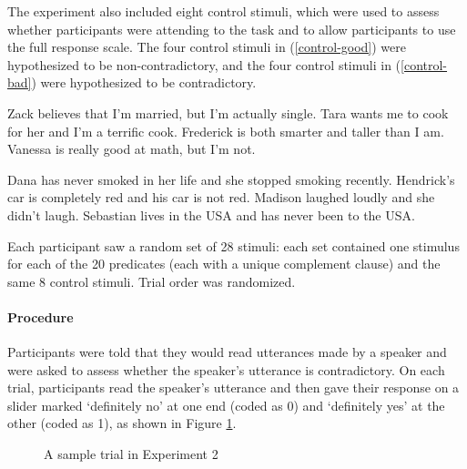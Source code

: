 \documentclass[11pt,fleqn]{article}
\newcommand{\6}{\mbox{$[\hspace*{-.6mm}[$}}
\newcommand{\9}{\mbox{$]\hspace*{-.6mm}]$}}
\begin{document}
The experiment also included eight control stimuli, which were used to assess whether participants were attending to the task and to allow participants to use the full response scale. The four control stimuli in (\ref{control-good}) were hypothesized to be non-contradictory, and the four control stimuli in (\ref{control-bad}) were hypothesized to be contradictory.

\begin{exe}
\ex\label{control-good2}
\begin{xlist}
\ex Zack believes that I'm married, but I'm actually single.
\ex Tara wants me to cook for her and I'm a terrific cook.
\ex Frederick is both smarter and taller than I am.
\ex Vanessa is really good at math, but I'm not.
\end{xlist}
\ex\label{control-bad2}
\begin{xlist}
\ex Dana has never smoked in her life and she stopped smoking recently.
\ex Hendrick's car is completely red and his car is not red.
\ex Madison laughed loudly and she didn't laugh.
\ex Sebastian lives in the USA and has never been to the USA.
\end{xlist}
\end{exe}

Each participant saw a random set of 28 stimuli: each set contained one stimulus for each of the 20 predicates (each with a unique complement clause) and the same 8 control stimuli. Trial order was randomized.


\paragraph{Procedure} Participants were told that they would read utterances made by a speaker and were asked to assess whether the speaker's utterance is contradictory. On each trial, participants read the speaker's utterance and then gave their response on a slider marked `definitely no' at one end (coded as 0) and `definitely yes' at the other (coded as 1), as shown in Figure \ref{f-trial-exp3}.

\begin{figure}[h!]
\begin{center}
\end{center}
\caption{A sample trial in Experiment 2}\label{f-trial-exp3}
\end{figure}
\end{document}
